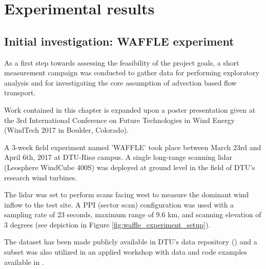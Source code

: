 \chapter{Experimental results}
\label{sec:results}

\clearpage
\section{Initial investigation: WAFFLE experiment}
\label{sec:waffle}


As a first step towards assessing the feasibility of the project goals, a short measurement campaign was conducted to gather data for performing exploratory analysis and for investigating the core assumption of advection based flow transport.

Work contained in this chapter is expanded upon a poster presentation given at the 3rd International Conference on Future Technologies in Wind Energy (WindTech 2017 in Boulder, Colorado).

A 3-week field experiment named 'WAFFLE' took place between March 23rd and April 6th, 2017 at DTU-Ris{\o} campus. A single long-range scanning lidar (Leosphere WindCube 400S) was deployed at ground level in the field of DTU's research wind turbines. 

The lidar was set to perform scans facing west to measure the dominant wind inflow to the test site. A PPI (sector scan) configuration was used with a sampling rate of 23 seconds, maximum range of 9.6 km, and scanning elevation of 3 degrees (see depiction in Figure \ref{fig:waffle_experiment_setup}).

The dataset has been made publicly available in DTU's data repository (\cite{waffle_dataset}) and a subset was also utilized in an applied workshop with data and code examples available in \cite{simon_eawe_workshop}.

